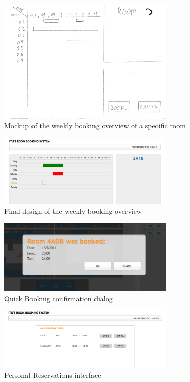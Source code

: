 \begin{figure}[htb]
\begin{center}
\leavevmode
\includegraphics[width=0.75\textwidth]{images/booking_overview}
\end{center}
\caption{Mockup of the weekly booking overview of a specific room}
\label{fig:app1_mock3_1}
\end{figure}

\begin{figure}[htb]
\begin{center}
\leavevmode
\includegraphics[width=0.75\textwidth]{images/simple_booking}
\end{center}
\caption{Final design of the weekly booking overview}
\label{fig:app1_mock3_2}
\end{figure}

\begin{figure}[htb]
\begin{center}
\leavevmode
\includegraphics[width=0.75\textwidth]{images/quick_booking}
\end{center}
\caption{Quick Booking confirmation dialog}
\label{fig:app1_mock1_7}
\end{figure}

\begin{figure}[htb]
\begin{center}
\leavevmode
\includegraphics[width=0.75\textwidth]{images/reservations}
\end{center}
\caption{Personal Reservations interface}
\label{fig:app1_mock3_2}
\end{figure}

\clearpage
